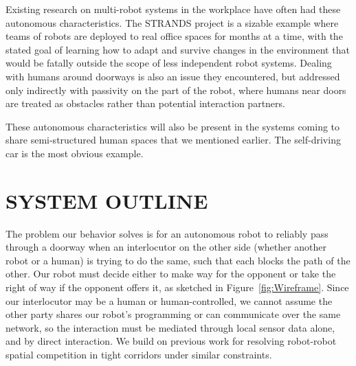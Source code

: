 \documentclass[letterpaper, 10 pt, conference]{ieeeconf}  %
\begin{document}

Existing research on multi-robot systems in the workplace have often had these autonomous characteristics. The STRANDS project\cite{hawes2016strands} is a sizable example where teams of robots are deployed to real office spaces for months at a time, with the stated goal of learning how to adapt and survive changes in the environment that would be fatally outside the scope of less independent robot systems. Dealing with humans around doorways is also an issue they encountered, but addressed only indirectly with passivity on the part of the robot, where humans near doors are treated as obstacles rather than potential interaction partners.

These autonomous characteristics will also be present in the systems coming to share semi-structured human spaces that we mentioned earlier. The self-driving car is the most obvious example. %


\section{SYSTEM OUTLINE}

The problem our behavior solves is for an autonomous robot to reliably pass through a doorway when an interlocutor on the other side (whether another robot or a human) is trying to do the same, such that each blocks the path of the other. Our robot must decide either to make way for the opponent or take the right of way if the opponent offers it, as sketched in Figure~\ref{fig:Wireframe}. Since our interlocutor may be a human or human-controlled, we cannot assume the other party shares our robot’s programming or can communicate over the same network, so the interaction must be mediated through local sensor data alone, and by direct interaction. We build on previous work for resolving robot-robot spatial competition in tight corridors under similar constraints.
\end{document}
